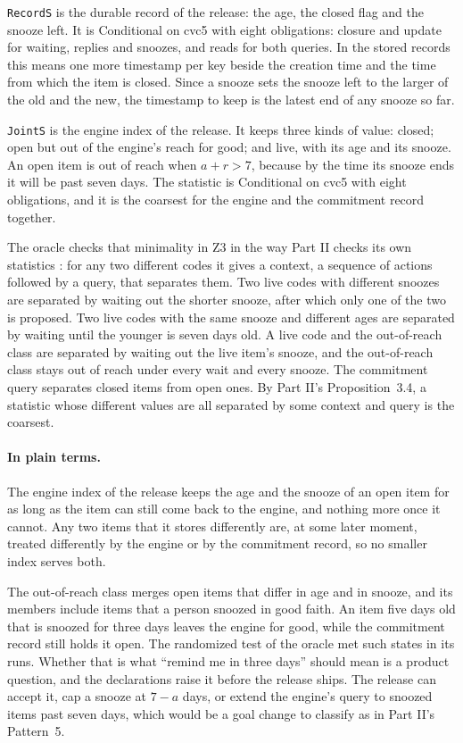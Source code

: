 \documentclass[11pt]{article}
\newcommand{\code}[1]{\texttt{#1}}
\newcommand{\plain}{\paragraph{In plain terms.}}
\theoremstyle{definition}
\theoremstyle{plain}
\begin{document}
\code{RecordS} is the durable record of the release: the age, the closed flag and the snooze left.
It is Conditional on cvc5 with eight obligations: closure and update for waiting, replies and snoozes, and
reads for both queries. In the stored records this means one more timestamp per key beside the
creation time and the time from which the item is closed. Since a snooze sets the snooze left to the
larger of the old and the new, the timestamp to keep is the latest end of any snooze so far.

\code{JointS} is the engine index of the release. It keeps three kinds of value: closed; open but
out of the engine's reach for good; and live, with its age and its snooze. An open item is out of
reach when $a+r>7$, because by the time its snooze ends it will be past seven days. The statistic is
Conditional on cvc5 with eight obligations, and it is the coarsest for the engine and the commitment record
together.

The oracle checks that minimality in Z3 in the way Part II checks its own statistics
\cite[Section~3.3]{part2}: for any two different codes it gives a context, a sequence of actions
followed by a query, that separates them. Two live codes with different snoozes are separated by
waiting out the shorter snooze, after which only one of the two is proposed. Two live codes with the
same snooze and different ages are separated by waiting until the younger is seven days old. A live
code and the out-of-reach class are separated by waiting out the live item's snooze, and the
out-of-reach class stays out of reach under every wait and every snooze. The commitment query
separates closed items from open ones. By Part II's Proposition~3.4, a statistic whose different
values are all separated by some context and query is the coarsest.

\plain The engine index of the release keeps the age and the snooze of an open item for as long as
the item can still come back to the engine, and nothing more once it cannot. Any two items that it
stores differently are, at some later moment, treated differently by the engine or by the
commitment record, so no smaller index serves both.

The out-of-reach class merges open items that differ in age and in snooze, and its members include
items that a person snoozed in good faith. An item five days old that is snoozed for three days
leaves the engine for good, while the commitment record still holds it open. The randomized test of
the oracle met such states in its runs. Whether that is what ``remind me in three days'' should
mean is a product question, and the declarations raise it before the release ships. The release can
accept it, cap a snooze at $7-a$ days, or extend the engine's query to snoozed items past seven
days, which would be a goal change to classify as in Part II's Pattern~5.
\end{document}
